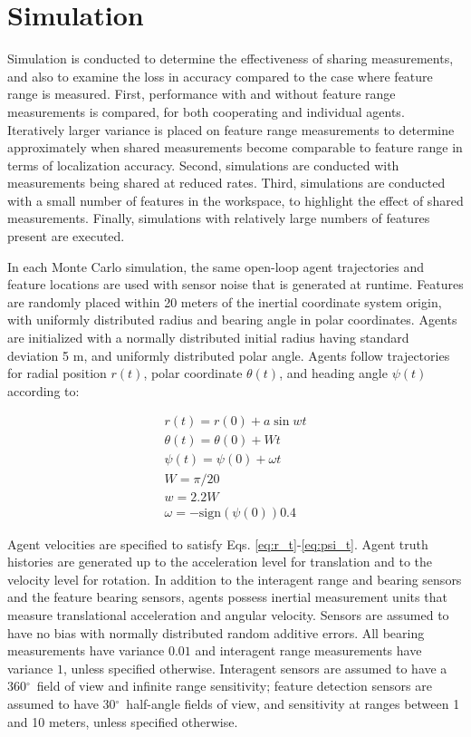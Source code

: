 \documentclass{aiaa-tc}
\newcommand{\degree}{\ensuremath{^\circ}}
\begin{document}
\section{Simulation}

Simulation is conducted to determine the effectiveness of sharing measurements, and also to examine the loss in accuracy compared to the case where feature range is measured. First, performance with and without feature range measurements is compared, for both cooperating and individual agents. Iteratively larger variance is placed on feature range measurements to determine approximately when shared measurements become comparable to feature range in terms of localization accuracy. Second, simulations are conducted with measurements being shared at reduced rates. Third, simulations are conducted with a small number of features in the workspace, to highlight the effect of shared measurements. Finally, simulations with relatively large numbers of features present are executed.

In each Monte Carlo simulation, the same open-loop agent trajectories and feature locations are used with sensor noise that is generated at runtime. Features are randomly placed within 20 meters of the inertial coordinate system origin, with uniformly distributed radius and bearing angle in polar coordinates. Agents are initialized with a normally distributed initial radius having standard deviation 5 m, and uniformly distributed polar angle. Agents follow trajectories for radial position $r(t)$, polar coordinate $\theta(t)$, and heading angle $\psi(t)$ according to:

\begin{align}
r(t) = r(0) + a\sin{wt}
\label{eq:r_t} \\
\theta(t) = \theta(0) + Wt \\
\psi(t) = \psi(0) + \omega t \label{eq:psi_t}
\\
W = \pi/20 \\
w = 2.2W\\
\omega = -\mathrm{sign}(\psi(0)) 0.4
\end{align}

Agent velocities are specified to satisfy Eqs. \ref{eq:r_t}-\ref{eq:psi_t}. Agent truth histories are generated up to the acceleration level for translation and to the velocity level for rotation. In addition to the interagent range and bearing sensors and the feature bearing sensors, agents possess inertial measurement units that measure translational acceleration and angular velocity. Sensors are assumed to have no bias with normally distributed random additive errors. All bearing measurements have variance $0.01$ and interagent range measurements have variance $1$, unless specified otherwise. Interagent sensors are assumed to have a 360\degree \ field of view and infinite range sensitivity; feature detection sensors are assumed to have 30\degree \ half-angle fields of view, and sensitivity at ranges between 1 and 10 meters, unless specified otherwise.
\end{document}

